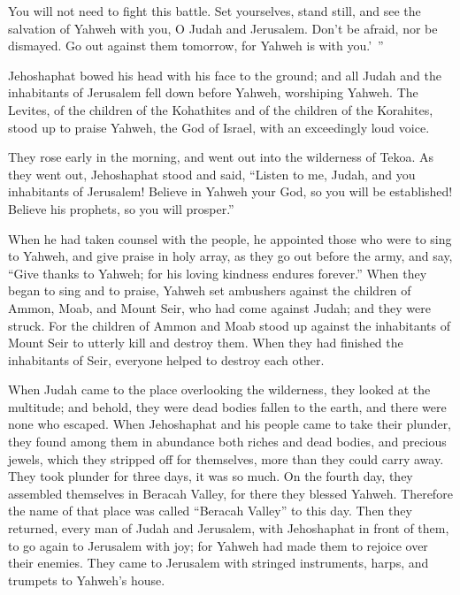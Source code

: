 {You will not need to fight this battle. Set yourselves, stand still, and see the salvation of Yahweh with you, O Judah and Jerusalem. Don’t be afraid, nor be dismayed. Go out against them tomorrow, for Yahweh is with you.’ ”
\par }{\PP {}Jehoshaphat bowed his head with his face to the ground; and all Judah and the inhabitants of Jerusalem fell down before Yahweh, worshiping Yahweh.
The Levites, of the children of the Kohathites and of the children of the Korahites, stood up to praise Yahweh, the God of Israel, with an exceedingly loud voice.
\par }{\PP {}They rose early in the morning, and went out into the wilderness of Tekoa. As they went out, Jehoshaphat stood and said, “Listen to me, Judah, and you inhabitants of Jerusalem! Believe in Yahweh your God, so you will be established! Believe his prophets, so you will prosper.”
\par }{\PP {}When he had taken counsel with the people, he appointed those who were to sing to Yahweh, and give praise in holy array, as they go out before the army, and say, “Give thanks to Yahweh; for his loving kindness endures forever.”
When they began to sing and to praise, Yahweh set ambushers against the children of Ammon, Moab, and Mount Seir, who had come against Judah; and they were struck.
For the children of Ammon and Moab stood up against the inhabitants of Mount Seir to utterly kill and destroy them. When they had finished the inhabitants of Seir, everyone helped to destroy each other.
\par }{\PP {}When Judah came to the place overlooking the wilderness, they looked at the multitude; and behold, they were dead bodies fallen to the earth, and there were none who escaped.
When Jehoshaphat and his people came to take their plunder, they found among them in abundance both riches and dead bodies, and precious jewels, which they stripped off for themselves, more than they could carry away. They took plunder for three days, it was so much.
On the fourth day, they assembled themselves in Beracah Valley, for there they blessed Yahweh. Therefore the name of that place was called “Beracah Valley” to this day.
Then they returned, every man of Judah and Jerusalem, with Jehoshaphat in front of them, to go again to Jerusalem with joy; for Yahweh had made them to rejoice over their enemies.
They came to Jerusalem with stringed instruments, harps, and trumpets to Yahweh’s house.
}
